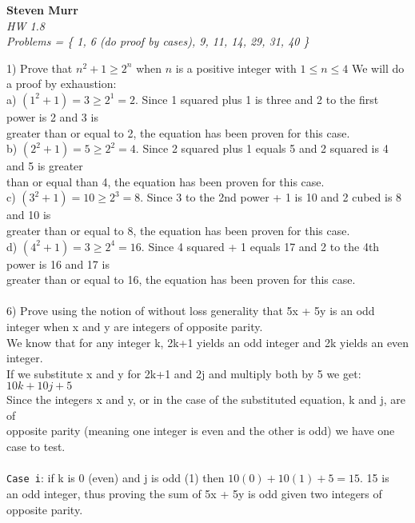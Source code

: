 \documentclass{article}
\begin{document}
\setcounter{totalnumber}{5}
   \begin{flushright}
      \Large\textbf{Steven Murr}\\
      \large\textit{HW 1.8} \\
      \large\textit{Problems = \{ 1, 6 (do proof by cases), 9, 11, 14, 29, 31, 40 \}}
   \end{flushright}
\begin{flushleft}
\makeatletter%
\setlength{\@fptop}{5pt}
\makeatother
\setlength\parindent{0pt}1) Prove that $n^2 + 1 \geq 2^n $ when $n$ is a positive integer with $1 \leq n \leq 4$
\setlength\parindent{24pt} We will do a proof by exhaustion: \\
\setlength\parindent{48pt} a) $(1^2 + 1) = 3 \geq 2^1 = 2 $.  Since 1 squared plus 1 is three and 2 to the first power is 2 and 3 is \\
greater than or equal to 2, the equation has been proven for this case. \\
\setlength\parindent{48pt} b) $(2^2 + 1) = 5 \geq 2^2 = 4 $.  Since 2 squared plus 1 equals 5 and 2 squared is 4 and 5 is greater \\than or equal than 4, the equation has been proven for this case. \\
\setlength\parindent{48pt} c) $(3^2 + 1) = 10 \geq 2^3 = 8 $.  Since 3 to the 2nd power + 1 is 10 and 2 cubed is 8 and 10 is \\greater than or equal to 8, the equation has been proven for this case.\\
\setlength\parindent{48pt} d) $(4^2 + 1) = 3 \geq 2^4 = 16 $.  Since 4 squared + 1 equals 17 and 2 to the 4th power is 16 and 17 is \\greater than or equal to 16, the equation has been proven for this case.\\
~\\
\setlength\parindent{0pt}6) Prove using the notion of without loss generality that 5x + 5y is an odd integer when x and y are integers of opposite parity.\\
\setlength\parindent{24pt} We know that for any integer k, 2k+1 yields an odd integer and 2k yields an even integer.  \\
\setlength\parindent{24pt} If we substitute x and y for 2k+1 and 2j and multiply both by 5 we get: $10k + 10j + 5$\\
\setlength\parindent{24pt} Since the integers x and y, or in the case of the substituted equation, k and j, are of \\opposite parity (meaning one integer is even and the other is odd) we have one case to test.  \\
~\\\setlength\parindent{24pt}\texttt{Case i}: if k is 0 (even) and j is odd (1) then $10(0) + 10(1) + 5 = 15$.  15 is \\an odd integer, thus proving the sum of 5x + 5y is odd given two integers of opposite parity.


\end{flushleft}
\end{document}
